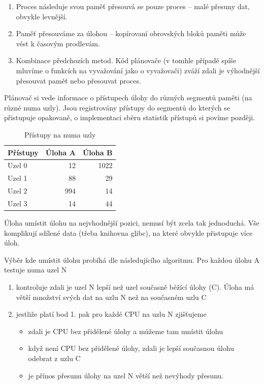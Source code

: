 \documentclass[a4paper,12pt]{article}
\begin{document}
\begin{enumerate}
\item Proces následuje svou paměť přesouvá se pouze proces – malé přesuny dat, obvykle levnější.
\item Paměť přesouváme za úlohou – kopírovaní obrovských bloků paměti může vést k časovým prodlevám.
\item Kombinace předchozích metod. Kód plánovače (v tomhle případě spíše mluvíme o funkcích na vyvažování jako o vyvažovači) zváží zdali je výhodnější přesouvat paměť nebo přesouvat proces.
\end{enumerate}

Plánovač si vede informace o přístupech úlohy do různých segmentů paměti (na různé numa uzly). Jsou registrovány přístupy do segmentů do kterých se přistupuje opakovaně, o implementaci sběru statistik přístupů si povíme později.

\begin{table}[h]
\centering
\begin{tabular}{|l|r|r|}
\hline
Přístupy & Úloha A & Úloha B \\
\hline
Uzel 0 & 12 & 1022 \\
\hline
Uzel 1 & 88 & 29 \\
\hline
Uzel 2 & 994 & 14 \\
\hline
Uzel 3 & 14 & 44 \\
\hline
\end{tabular}

\caption{Přístupy na numa uzly}
\label{table1}
\end{table}

Úloha umístit úlohu na nejvhodnější pozici, nemusí být zcela tak jednoduchá. Vše komplikují sdílené data (třeba knihovna glibc), na které obvykle přistupuje více úloh. 

Výběr kde umístit úlohu probíhá dle následujícího algoritmu. 
Pro každou úlohu A testuje numa uzel N
\begin{enumerate}
\item kontroluje zdali je uzel N lepší než uzel současně běžící úlohy (C). Úloha má větší množství svých dat na uzlu N než na současném uzlu C
\item jestliže platí bod 1. pak pro každé CPU na uzlu N zjišťujeme 
\begin{itemize}
\item zdali je CPU bez přidělené úlohy a můžeme tam umístit úlohu
\item když není CPU bez přidělené úlohy,  zdali je lepší současnou úlohu odebrat z uzlu C
\item je přínos přesunu úlohy na uzel N větší než nevýhody přesunu.
\end{itemize}
\end{enumerate}
\end{document}
